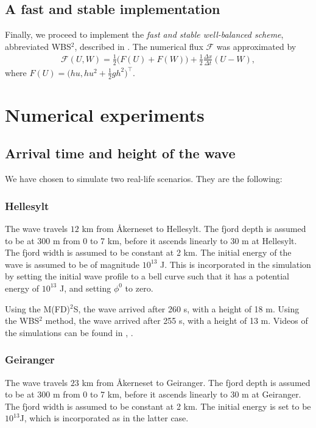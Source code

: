 \documentclass[11pt]{article}
\begin{document}
\subsection{A fast and stable implementation}
Finally, we proceed to implement the \emph{fast and stable well-balanced scheme}, abbreviated WBS$^2$, described in \cite{audusse04}. The numerical flux $\mathcal{F}$ was approximated by
\begin{align*}
    \mathcal{F}(U, W) = \frac{1}{2}\big(F(U) + F(W)\big) + \frac{1}{2} \frac{\Delta x}{\Delta t} (U - W),
\end{align*}
where $F(U) = \big(hu, hu^2 + \frac{1}{2}gh^2\big)^\top$.
%
%
\section{Numerical experiments}
\subsection{Arrival time and height of the wave}
We have chosen to simulate two real-life scenarios. They are the following:

\subsubsection*{Hellesylt}
The wave travels $12$ km from Åkerneset to Hellesylt. The fjord depth is assumed to be at 300 m from 0 to 7 km, before it ascends linearly
to 30 m at Hellesylt. The fjord width is assumed to be constant at 2 km. The initial energy of the wave is assumed to be of magnitude $10^{13}$ J. This is incorporated in the simulation by
setting the initial wave profile to a bell curve such that it has a potential energy of $10^{13}$ J, and setting $\phi^0$ to zero.

Using the M(FD)$^2$S, the wave arrived after 260 s, with a height of 18 m. Using the WBS$^2$ method, the wave arrived after 255 s, with a height of 13 m.
Videos of the simulations can be found in \cite{hellesyltMFDFD}, \cite{hellesyltWBSS}.

\subsubsection*{Geiranger}
The wave travels $23$ km from Åkerneset to Geiranger. The fjord depth is assumed to be at 300 m from 0 to 7 km, before it ascends linearly
to 30 m at Geiranger. The fjord width is assumed to be constant at 2 km. The initial energy is set to be $10^{13}$J, which is incorporated as in the latter case.
\end{document}
